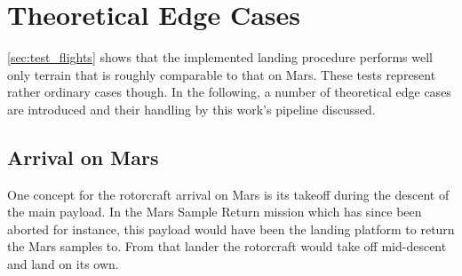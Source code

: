 


    

\section{Theoretical Edge Cases}
\cref{sec:test_flights} shows that the implemented landing procedure performs well only terrain that is roughly comparable to that on Mars. These tests represent rather ordinary cases though. In the following, a number of theoretical edge cases are introduced and their handling by this work's pipeline discussed.

\subsection{Arrival on Mars}
One concept for the rotorcraft arrival on Mars is its takeoff during the descent of the main payload. In the Mars Sample Return mission which has since been aborted for instance, this payload would have been the landing platform to return the Mars samples to. From that lander the rotorcraft would take off mid-descent and land on its own.

